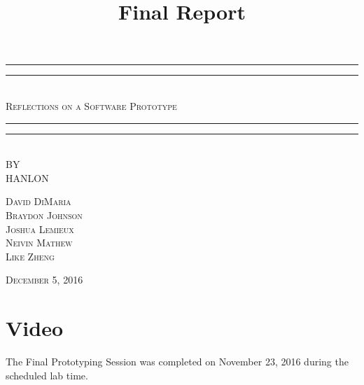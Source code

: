 \documentclass[12pt,letterpaper]{article}
\title{Final Report}
\begin{document}
\begin{titlepage}
    \centering
    \vspace*{\baselineskip}
    \rule{\textwidth}{1.6pt}\vspace*{-\baselineskip}\vspace*{2pt}
    \rule{\textwidth}{0.4pt}\\[1.5\baselineskip]
    {\LARGE \textsc{Reflections on a Software Prototype}}\\[\baselineskip]
	\rule{\textwidth}{0.4pt}\vspace*{-\baselineskip}\vspace{4pt}    
    \rule{\textwidth}{2pt}\\[2\baselineskip]
   
    \vspace*{5\baselineskip}
    \textsc{BY}\\[0.25\baselineskip]
    {\LARGE HANLON} \\
    
    \vspace*{\baselineskip}
    {\textsc{David DiMaria \\ Braydon Johnson \\ Joshua Lemieux \\ Neivin Mathew \\ Like Zheng} \par}
    \vfill
    {\scshape December 5, 2016} \\
  \end{titlepage}
  
  
\tableofcontents
\lhead{} %
\clearpage
{} %
    
\clearpage
\section{Video}
The Final Prototyping Session was completed on November 23, 2016 during the scheduled lab time.


\clearpage
\end{document}
